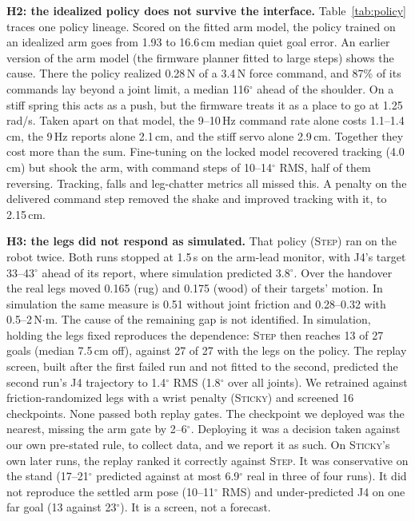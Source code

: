\documentclass[conference]{IEEEtran}
\newcommand{\hyp}[1]{\textbf{H#1}}
\begin{document}
\textbf{\hyp{2}: the idealized policy does not survive the interface.} Table~\ref{tab:policy} traces one policy lineage.
Scored on the fitted arm model, the policy trained on an idealized arm goes from 1.93 to 16.6\,cm median quiet goal error.
An earlier version of the arm model (the firmware planner fitted to large steps) shows the cause. There the policy
realized 0.28\,N of a 3.4\,N force command, and 87\% of its commands lay beyond a joint limit, a median 116$^\circ$ ahead
of the shoulder. On a stiff spring this acts as a push, but the firmware treats it as a place to go at 1.25\,rad/s.
Taken apart on that model, the 9--10\,Hz command rate alone costs 1.1--1.4\,cm, the 9\,Hz reports alone 2.1\,cm, and
the stiff servo alone 2.9\,cm. Together they cost more than the sum. Fine-tuning on the locked model recovered tracking (4.0\,cm) but shook the arm, with command steps of
10--14$^\circ$ RMS, half of them reversing. Tracking, falls and leg-chatter metrics all missed this. A penalty on the
delivered command step removed the shake and improved tracking with it, to 2.15\,cm.

\textbf{\hyp{3}: the legs did not respond as simulated.} That policy (\textsc{Step}) ran on the robot twice. Both runs
stopped at 1.5\,s on the arm-lead monitor, with J4's target 33--43$^\circ$ ahead of its report, where simulation
predicted 3.8$^\circ$. Over the handover the real legs moved 0.165 (rug) and 0.175 (wood) of their targets' motion. In
simulation the same measure is 0.51 without joint friction and 0.28--0.32 with 0.5--2\,N$\cdot$m. The cause of the
remaining gap is not identified. In simulation, holding the legs fixed reproduces the dependence: \textsc{Step} then reaches 13 of 27 goals
(median 7.5\,cm off), against 27 of 27 with the legs on the policy. The replay screen, built after the first failed run and not
fitted to the second, predicted the second run's J4 trajectory to 1.4$^\circ$ RMS (1.8$^\circ$ over all joints). We
retrained against friction-randomized legs with a wrist penalty (\textsc{Sticky}) and screened 16 checkpoints. None
passed both replay gates. The checkpoint we deployed was the nearest, missing the arm gate by 2--6$^\circ$. Deploying it
was a decision taken against our own pre-stated rule, to collect data, and we report it as such. On \textsc{Sticky}'s own
later runs, the replay ranked it correctly against \textsc{Step}. It was conservative on the stand (17--21$^\circ$ predicted
against at most 6.9$^\circ$ real in three of four runs). It did not reproduce the settled arm pose (10--11$^\circ$ RMS) and
under-predicted J4 on one far goal (13 against 23$^\circ$). It is a screen, not a forecast.
\end{document}
